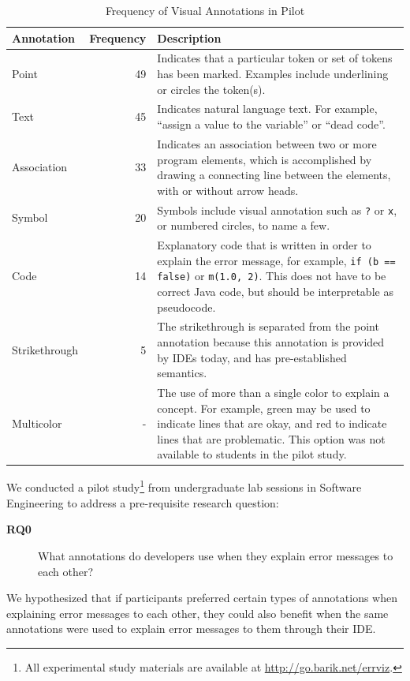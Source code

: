 \documentclass[conference]{IEEEtran}
\begin{document}
\begin{table}[!t]
\caption{Frequency of Visual Annotations in Pilot\label{tab:pilot}}
\centering
\begin{tabularx}{\columnwidth}{lrX}
\toprule
Annotation & Frequency & Description\\
\midrule
Point & 49 & Indicates that a particular token or set of tokens has been marked. Examples include underlining or circles the token(s).\\
[0.2cm]
Text & 45 & Indicates natural language text. For example, ``assign a value to the variable'' or ``dead code''.\\
[0.2cm]
Association & 33 & Indicates an association between two or more program elements, which is accomplished by drawing a connecting line between the elements, with or without arrow heads.\\
[0.2cm]
Symbol & 20 & Symbols include visual annotation such as \texttt{?} or \texttt{x}, or numbered circles, to name a few.\\
[0.2cm]
Code & 14 & Explanatory code that is written in order to explain the error message, for example, \texttt{if (b == false)} or \texttt{m(1.0, 2)}. This does not have to be correct Java code, but should be interpretable as pseudocode.\\
[0.2cm]
Strikethrough & 5 & The strikethrough is separated from the point annotation because this annotation is provided by IDEs today, and has pre-established semantics.
\\
[0.2cm]
Multicolor & - & The use of more than a single color to explain a concept. For example, green may be used to indicate lines that are okay, and red to indicate lines that are problematic. This option was not available to students in the pilot study.\\
[0.2cm]
\bottomrule
\end{tabularx}
\end{table}

We conducted a pilot study\footnote{All experimental study materials are available at \url{http://go.barik.net/errviz}.} from undergraduate lab sessions in Software Engineering to address a pre-requisite research question:
\begin{description}
\item[\textbf{RQ0}] What annotations do developers use when they explain error messages to each other?
\end{description}

We hypothesized that if participants preferred certain types of annotations when explaining error messages to each other, they could also benefit when the same annotations were used to explain error messages to them through their IDE.
\end{document}
